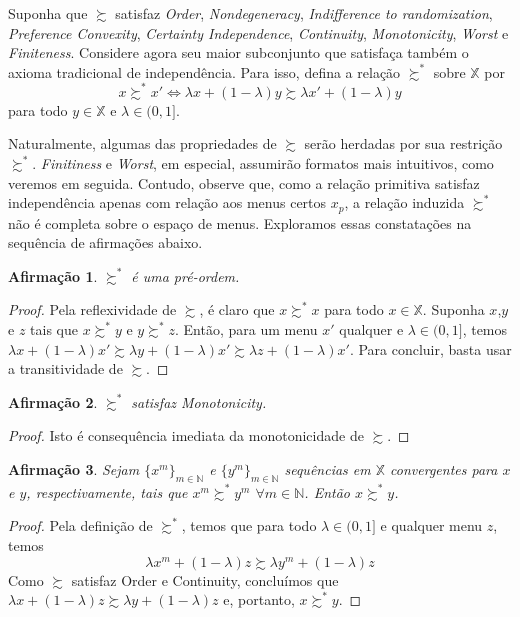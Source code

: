 \documentclass[11pt, a4paper]{article}
\theoremstyle{nonumberplain}
\newtheorem{proof}{Dem.}
\theoremstyle{plain}
\theoremstyle{plain}
\newtheorem{claim}{Afirmação}
\theoremstyle{plain}
\begin{document}
Suponha que $\succsim$ satisfaz \textit{Order}, \textit{Nondegeneracy}, \textit{Indifference to randomization}, \textit{Preference Convexity}, \textit{Certainty Independence}, \textit{Continuity}, \textit{Monotonicity}, \textit{Worst} e \textit{Finiteness}. Considere agora seu maior subconjunto que satisfaça também o axioma tradicional de independência. Para isso, defina a relação $\succsim^*$ sobre $\mathbb{X}$ por $$x\succsim^* x' \Leftrightarrow \lambda x + (1-\lambda)y \succsim \lambda x' + (1-\lambda)y$$ para todo $y\in \mathbb{X}$ e $\lambda\in(0,1]$.

Naturalmente, algumas das propriedades de $\succsim$ serão herdadas por sua restrição $\succsim^*$. \textit{Finitiness} e \textit{Worst}, em especial, assumirão formatos mais intuitivos, como veremos em seguida. Contudo, observe que, como a relação primitiva satisfaz independência apenas com relação aos menus certos $x_p$, a relação induzida $\succsim^*$ não é completa sobre o espaço de menus. Exploramos essas constatações na sequência de afirmações abaixo.


\begin{claim}$\succsim^*$ é uma pré-ordem. \end{claim}
\begin{proof} Pela reflexividade de $\succsim$, é claro que $x\succsim^* x$ para todo $x\in \mathbb{X}$. Suponha $x$,$y$ e $z$ tais que $x\succsim^* y$ e $y\succsim^* z$. Então, para um menu $x'$ qualquer e $\lambda\in(0,1]$, temos $\lambda x + (1-\lambda)x'\succsim \lambda y + (1-\lambda)x'\succsim \lambda z + (1-\lambda)x'$. Para concluir, basta usar a transitividade de $\succsim$.
\end{proof}


\begin{claim}\label{monotonicidade}$\succsim^*$ satisfaz Monotonicity. \end{claim}
\begin{proof}
Isto é consequência imediata da monotonicidade de $\succsim$.    
\end{proof}

\begin{claim}\label{continuidade} Sejam $\{x^m\}_{m\in\mathbb{N}}$ e $\{y^m\}_{m\in\mathbb{N}}$ sequências em $\mathbb{X}$ convergentes para $x$ e $y$, respectivamente, tais que $x^m\succsim^* y^m$ $\forall m\in \mathbb{N}$. Então $x\succsim^* y$.\end{claim}
\begin{proof}
Pela definição de $\succsim^*$, temos que para todo $\lambda\in (0,1]$ e qualquer menu $z$, temos $$\lambda x^m + (1-\lambda)z \succsim \lambda y^m + (1-\lambda)z$$ Como $\succsim$ satisfaz Order e Continuity, concluímos que $\lambda x + (1-\lambda)z \succsim \lambda y + (1-\lambda)z$ e, portanto, $x\succsim^* y$.
\end{proof}
\end{document}
